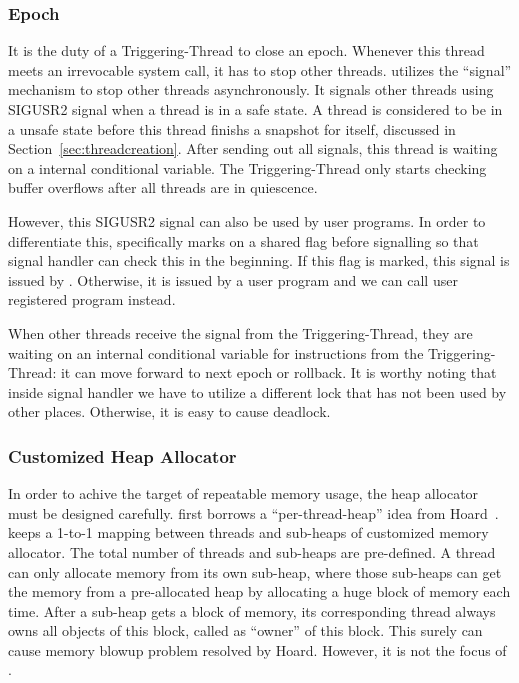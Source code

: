 \subsubsection{Epoch}
\label{sec:stopepoch}

It is the duty of a Triggering-Thread to close an epoch.
Whenever this thread meets an irrevocable system call, it has to stop other threads.
\doubletake{} utilizes the ``signal'' mechanism to stop other threads asynchronously.
It signals other threads using SIGUSR2 signal when a thread is in a safe state. 
A thread is considered to be in a unsafe state before this thread finishs a snapshot for itself,
discussed in Section~\ref{sec:threadcreation}.
After sending out all signals, this thread is waiting on a internal conditional variable.
The Triggering-Thread only starts checking buffer overflows after all threads are in quiescence.

However, this SIGUSR2 signal can also be used by user programs. 
In order to differentiate this, \doubletake{} specifically marks on 
a shared flag before signalling so that signal handler can check this in the beginning. 
If this flag is marked, this signal is issued by \doubletake{}. Otherwise, it is issued by
a user program and we can call user registered program instead. 

When other threads receive the signal from the Triggering-Thread, 
they are waiting on an internal conditional variable for instructions from the Triggering-Thread:
it can move forward to next epoch or rollback.
It is worthy noting that inside signal handler we have to utilize a different lock that has not been
used by other places. Otherwise, it is easy to cause deadlock. 

\subsubsection{Customized Heap Allocator}
\label{sec:mtheap}
In order to achive the target of repeatable memory usage, the heap allocator must be designed 
carefully. \doubletake{} first borrows a ``per-thread-heap'' idea from Hoard~\cite{Hoard}. 
\doubletake{} keeps a 1-to-1 mapping between threads and sub-heaps of customized memory allocator. 
The total number of threads and sub-heaps are pre-defined. 
A thread can only allocate memory from its own sub-heap, 
where those sub-heaps can get the memory from a pre-allocated heap 
by allocating a huge block of memory each time. 
After a sub-heap gets a block of memory, its corresponding thread always owns all objects
of this block, called as ``owner'' of this block.
This surely can cause memory blowup problem resolved by Hoard. However, it is 
not the focus of \doubletake{}.   

